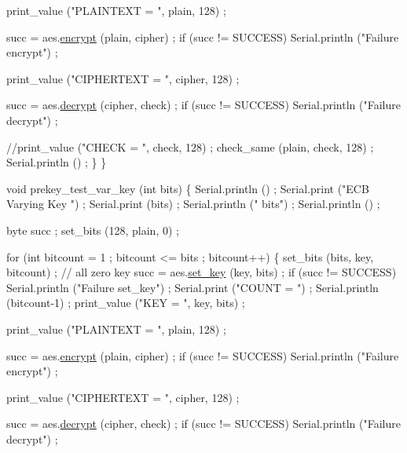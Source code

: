 \begin{DoxyCodeInclude}
      print\_value (\textcolor{stringliteral}{"PLAINTEXT = "}, plain, 128) ;
      
      succ = aes.\hyperlink{classAES_a72a674e99a92e296d1bf03444fe6ea15}{encrypt} (plain, cipher) ;
      \textcolor{keywordflow}{if} (succ != SUCCESS)
        Serial.println (\textcolor{stringliteral}{"Failure encrypt"}) ;

      print\_value (\textcolor{stringliteral}{"CIPHERTEXT = "}, cipher, 128) ;
      
      succ = aes.\hyperlink{classAES_abc514d1129789a60d60127f151450e9c}{decrypt} (cipher, check) ;
      \textcolor{keywordflow}{if} (succ != SUCCESS)
        Serial.println (\textcolor{stringliteral}{"Failure decrypt"}) ;

      \textcolor{comment}{//print\_value ("CHECK = ", check, 128) ;}
      check\_same (plain, check, 128) ;
      Serial.println () ;
    \}
\}


\textcolor{keywordtype}{void} prekey\_test\_var\_key (\textcolor{keywordtype}{int} bits)
\{
  Serial.println () ;
  Serial.print (\textcolor{stringliteral}{"ECB Varying Key "}) ;
  Serial.print (bits) ;
  Serial.println (\textcolor{stringliteral}{" bits"}) ;
  Serial.println () ;
  
  byte succ ;
  set\_bits (128, plain, 0) ;

  \textcolor{keywordflow}{for} (\textcolor{keywordtype}{int} bitcount = 1 ; bitcount <= bits ; bitcount++)
    \{
      set\_bits (bits, key, bitcount) ;  \textcolor{comment}{// all zero key}
      succ = aes.\hyperlink{classAES_afe2900d46f475f6f3ea8d164e1581ed9}{set\_key} (key, bits) ;
      \textcolor{keywordflow}{if} (succ != SUCCESS)
        Serial.println (\textcolor{stringliteral}{"Failure set\_key"}) ;
      Serial.print (\textcolor{stringliteral}{"COUNT = "}) ; Serial.println (bitcount-1) ;
      print\_value (\textcolor{stringliteral}{"KEY = "}, key, bits) ;

      print\_value (\textcolor{stringliteral}{"PLAINTEXT = "}, plain, 128) ;

      succ = aes.\hyperlink{classAES_a72a674e99a92e296d1bf03444fe6ea15}{encrypt} (plain, cipher) ;
      \textcolor{keywordflow}{if} (succ != SUCCESS)
        Serial.println (\textcolor{stringliteral}{"Failure encrypt"}) ;

      print\_value (\textcolor{stringliteral}{"CIPHERTEXT = "}, cipher, 128) ;

      succ = aes.\hyperlink{classAES_abc514d1129789a60d60127f151450e9c}{decrypt} (cipher, check) ;
      \textcolor{keywordflow}{if} (succ != SUCCESS)
        Serial.println (\textcolor{stringliteral}{"Failure decrypt"}) ;


\end{DoxyCodeInclude}
